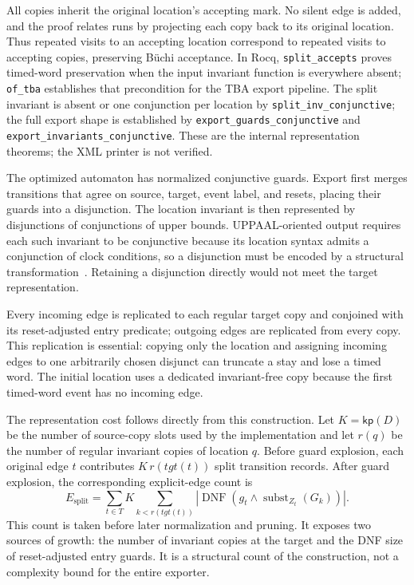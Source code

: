 \documentclass{ieeeaccess}
\begin{document}
All copies inherit the original location's accepting mark. No silent edge is
added, and the proof relates runs by projecting each copy back to its
original location. Thus repeated visits to an accepting location correspond
to repeated visits to accepting copies, preserving B\"uchi acceptance. In
Rocq, \texttt{split\_accepts} proves timed-word preservation when the input
invariant function is everywhere absent; \texttt{of\_tba} establishes that
precondition for the TBA export pipeline. The split invariant is absent or
one conjunction per location by \texttt{split\_inv\_conjunctive}; the full
export shape is established by \texttt{export\_guards\_conjunctive} and
\texttt{export\_invariants\_conjunctive}. These are the internal
representation theorems; the XML printer is not verified.

The optimized automaton has normalized conjunctive guards. Export first merges transitions that agree on source, target, event label, and resets, placing their guards into a disjunction. The location invariant is then represented by disjunctions of conjunctions of upper bounds. UPPAAL-oriented output requires each such invariant to be conjunctive because its location syntax admits a conjunction of clock conditions, so a disjunction must be encoded by a structural transformation~\cite{[BGD04]}. Retaining a disjunction directly would not meet the target representation.

Every incoming edge is replicated to each regular target copy and conjoined with its reset-adjusted entry predicate; outgoing edges are replicated from every copy. This replication is essential: copying only the location and assigning incoming edges to one arbitrarily chosen disjunct can truncate a stay and lose a timed word. The initial location uses a dedicated invariant-free copy because the first timed-word event has no incoming edge.

The representation cost follows directly from this construction. Let
$K=\mathsf{kp}(D)$ be the number of source-copy slots used by the
implementation and let $r(q)$ be the number of regular invariant copies of
location $q$. Before guard explosion, each original edge $t$ contributes
$K\,r(\mathit{tgt}(t))$ split transition records. After guard explosion,
the corresponding explicit-edge count is
\[
 E_{\mathrm{split}}=\sum_{t\in T}K\sum_{k<r(\mathit{tgt}(t))}
 \left|\operatorname{DNF}\!\left(g_t\land
   \operatorname{subst}_{Z_t}(G_k)\right)\right|.
\]
This count is taken before later normalization and pruning. It exposes two
sources of growth: the number of invariant copies at the target and the DNF
size of reset-adjusted entry guards. It is a structural count of the
construction, not a complexity bound for the entire exporter.
\end{document}
